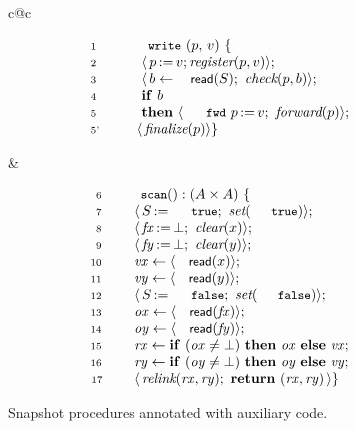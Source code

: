 \begin{figure}[t]
%
\centering
\begin{tabular}{c@{\hfill}c}
%
\begin{minipage}[t]{.5\textwidth}
\[
\begin{array}{ll}
\num{1}~ & ~~ \esc{write}\ (p,\, v)\ \{\\ 
\num{2}~ & ~~~~~ \lat\,\actwrite{p}{v}; \aux{register}(p,v)\rat;\\
\num{3}~ & ~~~~~ \lat\, b \tbnd \act{read}(S);\ \aux{check}(p,b) \rat;\\
\num{4}~ & ~~~~~ \kw{if}\ b\\
\num{5}~ & ~~~~~ \kw{then}\ \lat\,%
                           \actwrite{\aleksfwdp{p}}{v};\ \aux{forward}(p)\rat; \\
\num{5'}~           & ~~~~ \lat\,\aux{finalize}(p)\rat\}
\end{array}
\]
\end{minipage}
%
&
%
\begin{minipage}[t]{.5\textwidth}
\[
\begin{array}{rl}
\num{6}~  & \esc{scan} () : ( A \times A )~ \{ \\ 
\num{7}~  & ~~~ \lat\,\actwrite{\s}{\esc{true}};\ \aux{set}(\esc{true}) \rat;\\  
\num{8}~  & ~~~ \lat\,\actwrite{\fx}{\bot};\ \aux{clear}(\x)\rat;\\
\num{9}~  & ~~~ \lat\,\actwrite{\fy}{\bot};\ \aux{clear}(\y)\rat;\\
\num{10}~ & ~~~ \var{vx} \tbnd \lat \act{read}(\x) \rat ; \\
\num{11}~ & ~~~ \var{vy} \tbnd \lat \act{read}(\y) \rat;  \\
\num{12}~ & ~~~ \lat\,\actwrite{\s}{\esc{false}};\ \aux{set}(\esc{false})\rat;\\
\num{13}~ & ~~~ \var{ox} \tbnd \lat \act{read}(\fx) \rat;\\
\num{14}~ & ~~~ \var{oy} \tbnd \lat \act{read}(\fy) \rat;\\
\num{15}~ & ~~~ \var{rx} \tbnd \kw{if}\ (\var{ox} \neq\bot)\
                \kw{then}\ \var{ox}\ \kw{else}\ \var{vx};\\
\num{16}~ & ~~~ \var{ry} \tbnd \kw{if}\ (\var{oy} \neq\bot)\
                \kw{then}\ \var{oy}\ \kw{else}\ \var{vy};\\
\num{17~} & ~~~ \lat\,\aux{relink}(\var{rx}, \var{ry});\
                \kw{return}\ (\var{rx}, \var{ry})\,\rat\}
\end{array}
\]
\end{minipage}
%
\end{tabular}
%
\caption{Snapshot procedures annotated with auxiliary code.}
\label{fig:fcsl-snapshot}
\end{figure}



